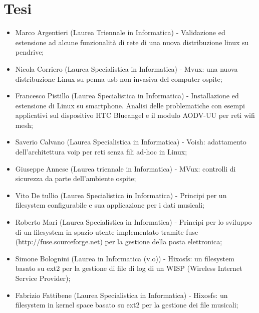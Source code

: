 \documentclass[a4paper,12pt]{article}
\renewcommand{\aa }{\`{a} }
\begin{document}
\section*{Tesi}
\begin{itemize}
\item Marco Argentieri (Laurea Triennale in Informatica) - Validazione ed estensione ad alcune funzionalit\aa di rete di una nuova distribuzione linux su pendrive;
\item Nicola Corriero (Laurea Specialistica in Informatica) - Mvux: una nuova distribuzione Linux su penna usb non invasiva del computer ospite;
\item Francesco Pistillo (Laurea Specialistica in Informatica) - Installazione ed estensione di Linux su smartphone. Analisi delle problematiche con esempi applicativi sul dispositivo HTC Blueangel e il modulo AODV-UU per reti wifi mesh;
\item Saverio Calvano (Laurea Specialistica in Informatica) - Voish: adattamento dell'architettura voip per reti senza fili ad-hoc in Linux;
\item Giuseppe Annese (Laurea triennale in Informatica) - MVux: controlli di sicurezza da parte dell'ambiente ospite;
\item Vito De tullio (Laurea Specialistica in Informatica) - Principi per un filesystem configurabile e sua applicazione per i dati musicali;
\item Roberto Mari (Laurea Specialistica in Informatica) - Principi per lo sviluppo di un filesystem in spazio utente implementato tramite fuse \\(http://fuse.sourceforge.net) per la gestione della posta elettronica;
\item Simone Bolognini (Laurea in Informatica  (v.o)) - Hixosfs: un filesystem basato su ext2 per la gestione di file di log di un WISP (Wireless Internet Service Provider);
\item Fabrizio Fattibene (Laurea Specialistica in Informatica) - Hixosfs: un filesystem in kernel space basato su ext2 per la gestione dei file musicali;
\end{itemize}
\end{document}
